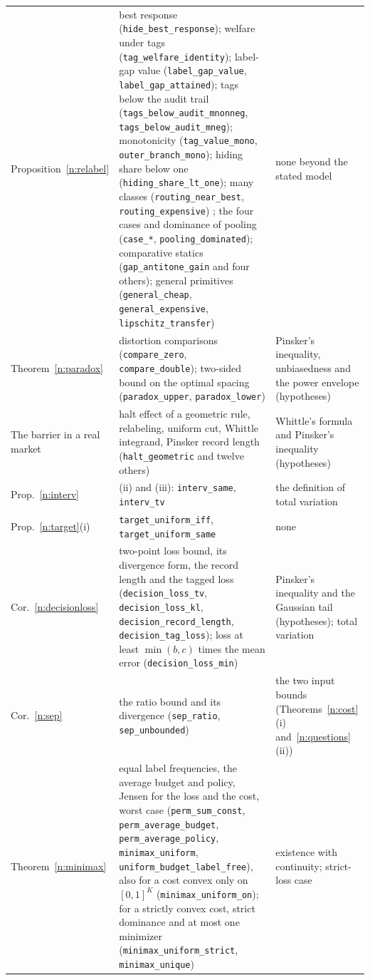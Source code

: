 \documentclass[12pt]{article}
\theoremstyle{definition}
\theoremstyle{remark}
\begin{document}
\begin{table}[ht]
\begin{tabular}{>{\raggedright\arraybackslash}p{}>{\raggedright\arraybackslash}p{}>{\raggedright\arraybackslash}p{}}
Proposition~\ref{n:relabel} & best response (\texttt{hide\_best\_response}); welfare under tags (\texttt{tag\_welfare\_identity}); label-gap value (\texttt{label\_gap\_value}, \texttt{label\_gap\_attained}); tags below the audit trail (\texttt{tags\_below\_audit\_mnonneg}, \texttt{tags\_below\_audit\_mneg}); monotonicity (\texttt{tag\_value\_mono}, \texttt{outer\_branch\_mono}); hiding share below one (\texttt{hiding\_share\_lt\_one}); many classes (\texttt{routing\_near\_best}, \texttt{routing\_expensive}) ; the four cases and dominance of pooling (\texttt{case\_*}, \texttt{pooling\_dominated}); comparative statics (\texttt{gap\_antitone\_gain} and four others); general primitives (\texttt{general\_cheap}, \texttt{general\_expensive}, \texttt{lipschitz\_transfer}) & none beyond the stated model\\
Theorem~\ref{n:paradox} & distortion comparisons (\texttt{compare\_zero}, \texttt{compare\_double}); two-sided bound on the optimal spacing (\texttt{paradox\_upper}, \texttt{paradox\_lower}) & Pinsker's inequality, unbiasedness and the power envelope (hypotheses)\\
The barrier in a real market & halt effect of a geometric rule, relabeling, uniform cut, Whittle integrand, Pinsker record length (\texttt{halt\_geometric} and twelve others) & Whittle's formula and Pinsker's inequality (hypotheses)\\
Prop.~\ref{n:interv} & (ii) and (iii): \texttt{interv\_same}, \texttt{interv\_tv} & the definition of total variation\\
Prop.~\ref{n:target}(i) & \texttt{target\_uniform\_iff}, \texttt{target\_uniform\_same} & none\\
Cor.~\ref{n:decisionloss} & two-point loss bound, its divergence form, the record length and the tagged loss (\texttt{decision\_loss\_tv}, \texttt{decision\_loss\_kl}, \texttt{decision\_record\_length}, \texttt{decision\_tag\_loss}); loss at least $\min(b,c)$ times the mean error (\nolinkurl{decision_loss_min}) & Pinsker's inequality and the Gaussian tail (hypotheses); total variation\\
Cor.~\ref{n:sep} & the ratio bound and its divergence (\texttt{sep\_ratio}, \texttt{sep\_unbounded}) & the two input bounds (Theorems~\ref{n:cost}(i) and~\ref{n:questions}(ii))\\
Theorem~\ref{n:minimax} & equal label frequencies, the average budget and policy, Jensen for the loss and the cost, worst case (\texttt{perm\_sum\_const}, \texttt{perm\_average\_budget}, \texttt{perm\_average\_policy}, \texttt{minimax\_uniform}, \nolinkurl{uniform_budget_label_free}), also for a cost convex only on $[0,1]^K$ (\nolinkurl{minimax_uniform_on}); for a strictly convex cost, strict dominance and at most one minimizer (\nolinkurl{minimax_uniform_strict}, \nolinkurl{minimax_unique}) & existence with continuity; strict-loss case\\

\end{tabular}
\end{table}
\end{document}
